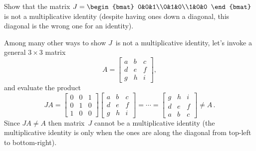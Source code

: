 \begin{example} 
Show that the matrix \(J=\begin{bmat} 0&0&1\\0&1&0\\1&0&0 \end{bmat}\) is not a multiplicative identity (despite having ones down a diagonal, this diagonal is the wrong one for an identity).
\begin{solution} 
Among many other ways to show \(J\)~is not a multiplicative identity, let's invoke a general \(3\times3\) matrix
\begin{equation*}
A=\begin{bmatrix} a&b&c\\d&e&f\\g&h&i \end{bmatrix},
\end{equation*}
and evaluate the product
\begin{equation*}
JA=
\begin{bmatrix} 0&0&1\\0&1&0\\1&0&0 \end{bmatrix}
\begin{bmatrix} a&b&c\\d&e&f\\g&h&i \end{bmatrix}
=\cdots
=\begin{bmatrix} g&h&i\\d&e&f\\a&b&c \end{bmatrix}
\neq A\,.
\end{equation*}
Since \(JA\neq A\) then matrix~\(J\) cannot be a multiplicative identity (the multiplicative identity is only when the ones are along the diagonal from top-left to bottom-right).
\end{solution}
\end{example}





